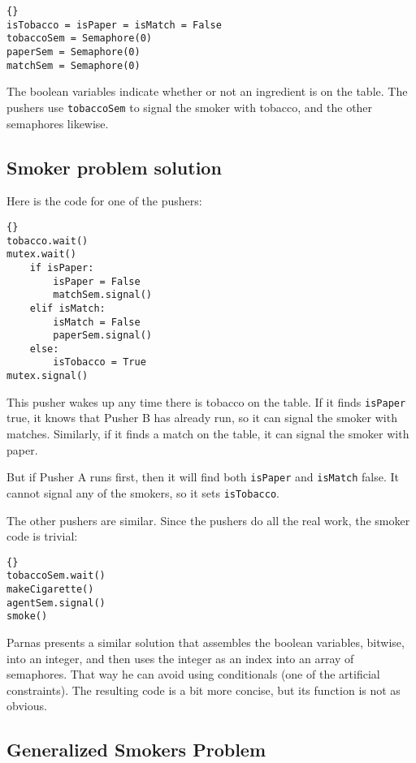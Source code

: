 \documentclass{book}
\newcommand{\clearemptydoublepage}{\newpage\cleardoublepage}
\begin{document}
\begin{lstlisting}[title={Smokers problem hint}]{}
isTobacco = isPaper = isMatch = False
tobaccoSem = Semaphore(0)
paperSem = Semaphore(0)
matchSem = Semaphore(0)
\end{lstlisting}

The boolean variables indicate whether or not an ingredient
is on the table.  The pushers use {\tt tobaccoSem} to signal
the smoker with tobacco, and the other semaphores likewise.


\clearemptydoublepage
\subsection{Smoker problem solution}

Here is the code for one of the pushers:

\begin{lstlisting}[title={Pusher A}]{}
tobacco.wait()
mutex.wait()
    if isPaper:
        isPaper = False
        matchSem.signal()
    elif isMatch:
        isMatch = False
        paperSem.signal()
    else: 
        isTobacco = True
mutex.signal()
\end{lstlisting}

This pusher wakes up any time there is tobacco on the
table.  If it finds {\tt isPaper} true, it knows that
Pusher B has already run, so it can signal the smoker
with matches.  Similarly, if it finds a match on the
table, it can signal the smoker with paper.

But if Pusher A runs first, then it will find both
{\tt isPaper} and {\tt isMatch} false.  It cannot signal
any of the smokers, so it sets {\tt isTobacco}.

The other pushers are similar.  Since the pushers do all
the real work, the smoker code is trivial:

\begin{lstlisting}[title={Smoker with tobacco}]{}
tobaccoSem.wait()
makeCigarette()
agentSem.signal()
smoke()
\end{lstlisting}

Parnas presents a similar solution that assembles the
boolean variables, bitwise, into an integer, and then
uses the integer as an index into an array of semaphores.
That way he can avoid using conditionals (one of the
artificial constraints).  The resulting code is a bit
more concise, but its function is not as obvious.


\subsection{Generalized Smokers Problem}
\end{document}
